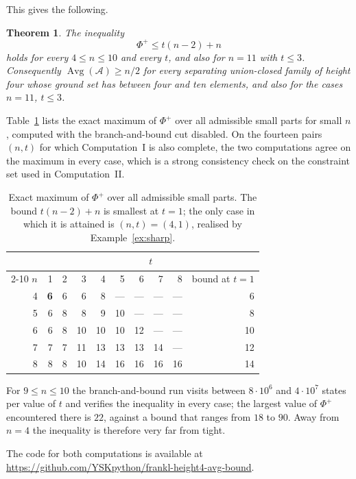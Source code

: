 \documentclass[11pt,a4paper]{amsart}
\theoremstyle{plain}
\newtheorem{theorem}{Theorem}[section]
\theoremstyle{definition}
\newcommand{\A}{\mathcal{A}}
\newcommand{\Avg}{\operatorname{Avg}}
\begin{document}
This gives the following.

\begin{theorem}\label{thm:small}
The inequality
\[
  \Phi^+\le t(n-2)+n
\]
holds for every $4\le n\le10$ and every $t$, and also for $n=11$ with $t\le3$.
Consequently $\Avg(\A)\ge n/2$ for every separating union-closed family of
height four whose ground set has between four and ten elements, and also for the cases
$n=11$, $t\le3$.
\end{theorem}

Table~\ref{tab:maxphi} lists the exact maximum of $\Phi^+$ over all admissible
small parts for small $n$, computed with the branch-and-bound cut disabled. On
the fourteen pairs $(n,t)$ for which Computation~I is also complete, the two
computations agree on the maximum in every case, which is a strong consistency
check on the constraint set used in Computation~II.

\begin{table}[ht]
\centering
\begin{tabular}{rrrrrrrrrr}
\toprule
& \multicolumn{9}{c}{$t$}\\
\cmidrule(l){2-10}
$n$ & 1 & 2 & 3 & 4 & 5 & 6 & 7 & 8 & bound at $t=1$\\
\midrule
4 & \textbf{6} & 6 & 6 & 8 & --- & --- & --- & --- & 6\\
5 & 6 & 8 & 8 & 9 & 10 & --- & --- & --- & 8\\
6 & 6 & 8 & 10 & 10 & 10 & 12 & --- & --- & 10\\
7 & 7 & 7 & 11 & 13 & 13 & 13 & 14 & --- & 12\\
8 & 8 & 8 & 10 & 14 & 16 & 16 & 16 & 16 & 14\\
\bottomrule
\end{tabular}
\caption{Exact maximum of $\Phi^+$ over all admissible small parts. The bound
$t(n-2)+n$ is smallest at $t=1$; the only case in which it is attained is
$(n,t)=(4,1)$, realised by Example~\ref{ex:sharp}.}
\label{tab:maxphi}
\end{table}

For $9\le n\le10$ the branch-and-bound run visits between $8\cdot10^6$ and
$4\cdot10^7$ states per value of $t$ and verifies the inequality in every case;
the largest value of $\Phi^+$ encountered there is $22$, against a bound that
ranges from $18$ to $90$. Away from $n=4$ the inequality is therefore very far
from tight.

The code for both computations is available at
\url{https://github.com/YSKpython/frankl-height4-avg-bound}.
\end{document}
